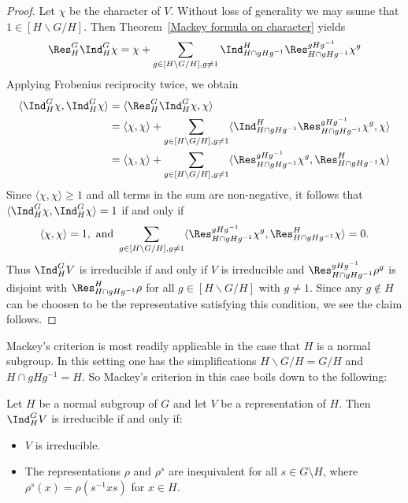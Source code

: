 \begin{proof}
Let $\chi$ be the character of $V$. Without loss of generality we may ssume that $1\in[H\backslash G/H]$. Then Theorem~\ref{Mackey formula on character} yields
\begin{align*}
\Res^G_H\Ind^G_H\chi=\chi+\sum_{g\in[H\backslash G/H],g\neq 1}\Ind^H_{H\cap gHg^{-1}}\Res^{gHg^{-1}}_{H\cap gHg^{-1}}\chi^g
\end{align*}
Applying Frobenius reciprocity twice, we obtain
\begin{align*}
\langle\Ind^G_H\chi,\Ind^G_H\chi\rangle&=\langle\Res^G_H\Ind^G_H\chi,\chi\rangle\\
&=\langle\chi,\chi\rangle+\sum_{g\in[H\backslash G/H],g\neq 1}\langle\Ind^H_{H\cap gHg^{-1}}\Res^{gHg^{-1}}_{H\cap gHg^{-1}}\chi^g,\chi\rangle\\
&=\langle\chi,\chi\rangle+\sum_{g\in[H\backslash G/H],g\neq 1}\langle\Res^{gHg^{-1}}_{H\cap gHg^{-1}}\chi^g,\Res^H_{H\cap gHg^{-1}}\chi\rangle
\end{align*}
Since $\langle\chi,\chi\rangle\geq 1$ and all terms in the sum are non-negative, it follows that $\langle\Ind^G_H\chi,\Ind^G_H\chi\rangle=1$ if and only if
\[\langle\chi,\chi\rangle=1,\text{ and }\sum_{g\in[H\backslash G/H],g\neq 1}\langle\Res^{gHg^{-1}}_{H\cap gHg^{-1}}\chi^g,\Res^H_{H\cap gHg^{-1}}\chi\rangle=0.\]
Thus $\Ind^G_HV$ is irreducible if and only if $V$ is irreducible and $\Res^{gHg^{-1}}_{H\cap gHg^{-1}}\rho^g$ is disjoint with $\Res^{H}_{H\cap gHg^{-1}}\rho$ for all $g\in[H\backslash G/H]$ with $g\neq 1$. Since any $g\notin H$ can be choosen to be the representative satisfying this condition, we see the claim follows.
\end{proof}
Mackey's criterion is most readily applicable in the case that $H$ is a normal subgroup. In this setting one has the simplifications $H\backslash G/H=G/H$ and $H\cap gHg^{-1}=H$. So Mackey's criterion in this case boils down to the following:
\begin{corollary}\label{Mackey's irreducibility criterion normal subgroup}
Let $H$ be a normal subgroup of $G$ and let $V$ be a representation of $H$. Then $\Ind^G_HV$ is irreducible if and only if:
\begin{itemize}
\item $V$ is irreducible.
\item The representations $\rho$ and $\rho^s$ are inequivalent for all $s\in G\setminus H$, where $\rho^s(x)=\rho(s^{-1}xs)$ for $x\in H$.
\end{itemize}
\end{corollary}
